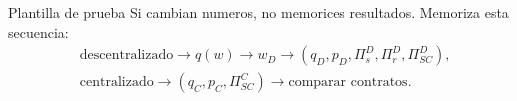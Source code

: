 \begin{trampa}{Plantilla de prueba}
Si cambian numeros, no memorices resultados. Memoriza esta secuencia:
\[
\begin{aligned}
&\text{descentralizado}
\rightarrow q(w)
\rightarrow w_D
\rightarrow (q_D,p_D,\Pi_s^D,\Pi_r^D,\Pi_{SC}^D),\\
&\text{centralizado}
\rightarrow (q_C,p_C,\Pi_{SC}^C)
\rightarrow \text{comparar contratos}.
\end{aligned}
\]
\end{trampa}
